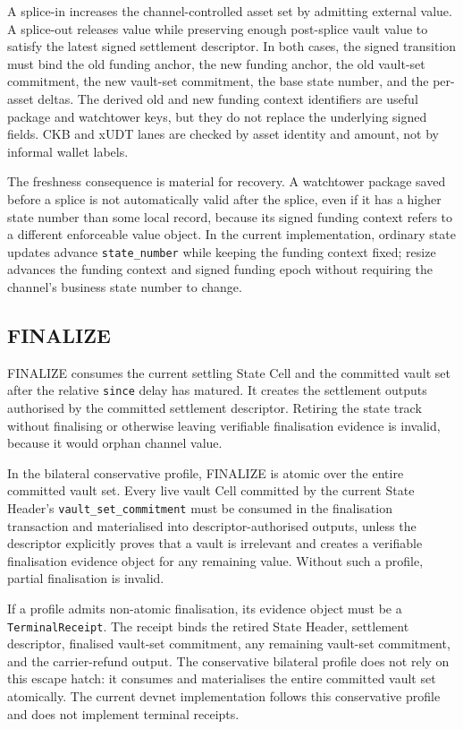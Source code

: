 \documentclass[a4paper,11pt]{article}
\begin{document}
A splice-in increases the channel-controlled asset set by admitting external value. A splice-out releases value while preserving enough post-splice vault value to satisfy the latest signed settlement descriptor. In both cases, the signed transition must bind the old funding anchor, the new funding anchor, the old vault-set commitment, the new vault-set commitment, the base state number, and the per-asset deltas. The derived old and new funding context identifiers are useful package and watchtower keys, but they do not replace the underlying signed fields. CKB and xUDT lanes are checked by asset identity and amount, not by informal wallet labels.

The freshness consequence is material for recovery. A watchtower package saved before a splice is not automatically valid after the splice, even if it has a higher state number than some local record, because its signed funding context refers to a different enforceable value object. In the current implementation, ordinary state updates advance \texttt{state\_number} while keeping the funding context fixed; resize advances the funding context and signed funding epoch without requiring the channel's business state number to change.

\subsection{FINALIZE}

\textsf{FINALIZE} consumes the current settling State Cell and the committed vault set after the relative \texttt{since} delay has matured. It creates the settlement outputs authorised by the committed settlement descriptor. Retiring the state track without finalising or otherwise leaving verifiable finalisation evidence is invalid, because it would orphan channel value.

In the bilateral conservative profile, \textsf{FINALIZE} is atomic over the
entire committed vault set. Every live vault Cell committed by the current
State Header's \texttt{vault\_set\_commitment} must be consumed in the
finalisation transaction and materialised into descriptor-authorised outputs,
unless the descriptor explicitly proves that a vault is irrelevant and creates
a verifiable finalisation evidence object for any remaining value. Without
such a profile, partial finalisation is invalid.

If a profile admits non-atomic finalisation, its evidence object must be a
\texttt{TerminalReceipt}. The receipt binds the retired State Header, settlement
descriptor, finalised vault-set commitment, any remaining vault-set commitment,
and the carrier-refund output. The conservative bilateral profile does not rely
on this escape hatch: it consumes and materialises the entire committed vault
set atomically.
The current devnet implementation follows this conservative profile and does
not implement terminal receipts.
\end{document}
